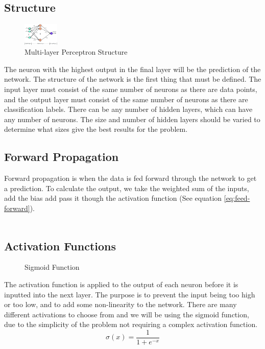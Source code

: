 \documentclass[a1,portrait]{a1poster}
\begin{document}
\begin{multicols}{2}
\subsection*{Structure}
\begin{figure}
    \centering
    \includegraphics[width=0.15\textwidth]{assets/multilayer perceptron.png}
    \caption{Multi-layer Perceptron Structure}
    \label{fig:structure}
\end{figure}
The neuron with the highest output in the final layer will be the prediction of the network.
The structure of the network is the first thing that must be defined. The input layer must consist of the same number of neurons as there are data points, and the output layer must consist of the same number of neurons as there are classification labels. There can be any number of hidden layers, which can have any number of neurons. The size and number of hidden layers should be varied to determine what sizes give the best results for the problem. 

\subsection*{Forward Propagation}
Forward propagation is when the data is fed forward through the network to get a prediction. To calculate the output, we take the weighted sum of the inputs, add the bias add pass it though the activation function (See equation \ref{eq:feed-forward}).
\\\\
\subsection*{Activation Functions}
\begin{figure}
    \centering
    \caption{Sigmoid Function}
    \label{fig:sigmoid}
\end{figure}
The activation function is applied to the output of each neuron before it is inputted into the next layer. The purpose is to prevent the input being too high or too low, and to add some non-linearity to the network. There are many different activations to choose from and we will be using the sigmoid function, due to the simplicity of the problem not requiring a complex activation function.
\begin{equation}
    \sigma(x)=\frac{1}{1+e^{-x}}
    \label{eq:sigmoid}
\end{equation}


\end{multicols}
\end{document}
